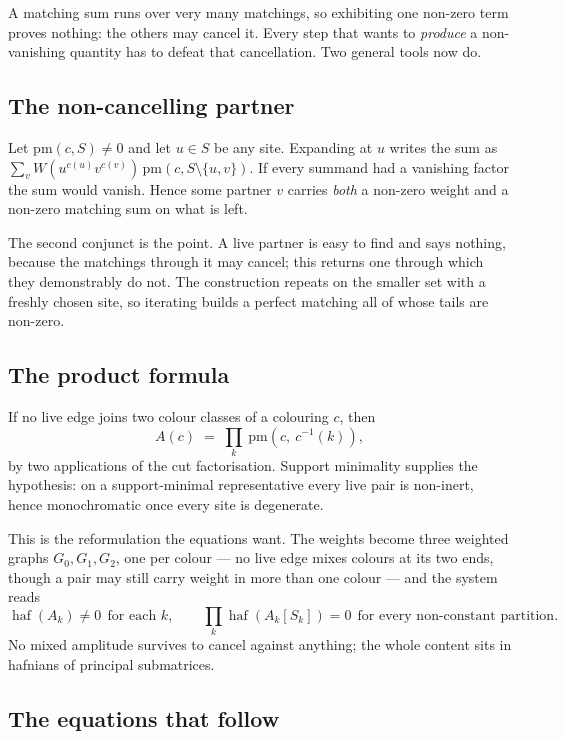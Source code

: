 \documentclass[11pt]{article}
\theoremstyle{definition}
\theoremstyle{remark}
\begin{document}
A matching sum runs over very many matchings, so exhibiting one non-zero term proves
nothing: the others may cancel it. Every step that wants to \emph{produce} a
non-vanishing quantity has to defeat that cancellation. Two general tools now do.

\subsection*{The non-cancelling partner}

Let $\mathrm{pm}(c,S)\neq 0$ and let $u\in S$ be any site. Expanding at $u$ writes
the sum as $\sum_{v} W\!\left(u^{c(u)}v^{c(v)}\right)\,\mathrm{pm}(c,S\setminus\{u,v\})$.
If every summand had a vanishing factor the sum would vanish. Hence some partner $v$
carries \emph{both} a non-zero weight and a non-zero matching sum on what is left.

The second conjunct is the point. A live partner is easy to find and says nothing,
because the matchings through it may cancel; this returns one through which they
demonstrably do not. The construction repeats on the smaller set with a freshly chosen
site, so iterating builds a perfect matching all of whose tails are non-zero.

\subsection*{The product formula}

If no live edge joins two colour classes of a colouring $c$, then
\[
  A(c) \;=\; \prod_{k}\ \mathrm{pm}\!\left(c,\ c^{-1}(k)\right),
\]
by two applications of the cut factorisation. Support minimality supplies the
hypothesis: on a support-minimal representative every live pair is non-inert, hence
monochromatic once every site is degenerate.

This is the reformulation the equations want. The weights become three weighted graphs
$G_0,G_1,G_2$, one per colour --- no live edge mixes colours at its two ends, though a
pair may still carry weight in more than one colour --- and the system reads
\[
  \operatorname{haf}(A_k)\neq 0 \ \ \text{for each } k,
  \qquad
  \prod_k \operatorname{haf}\!\left(A_k[S_k]\right)=0 \ \ \text{for every non-constant partition.}
\]
No mixed amplitude survives to cancel against anything; the whole content sits in
hafnians of principal submatrices.

\subsection*{The equations that follow}
\end{document}
